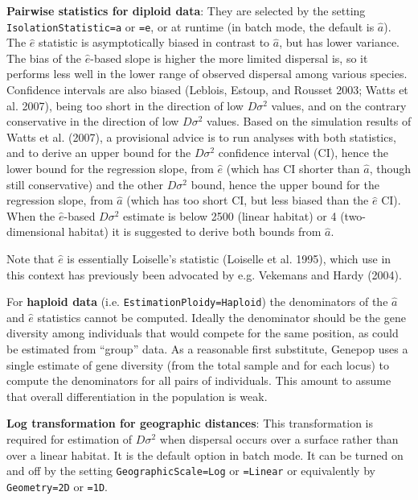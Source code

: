 \documentclass[12pt,]{book}
\theoremstyle{definition}
\theoremstyle{definition}
\theoremstyle{definition}
\theoremstyle{remark}
\begin{document}
\textbf{Pairwise statistics for diploid data}: They are selected by the
setting
\texttt{IsolationStatistic=a} or \texttt{=e}, or at runtime (in
batch mode, the default is \(\hat{a}\)). The \(\hat{e}\) statistic is
asymptotically biased in contrast to \(\hat{a}\), but has lower
variance. The bias of the \(\hat{e}\)-based slope is higher the more
limited dispersal is, so it performs less well in the lower range of
observed dispersal among various species. Confidence intervals are also
biased (Leblois, Estoup, and Rousset 2003; Watts et al. 2007), being too
short in the direction of low \(D\sigma^2\) values, and on the contrary
conservative in the direction of low \(D\sigma^2\) values. Based on the
simulation results of Watts et al. (2007), a provisional advice is to
run analyses with both statistics, and to derive an upper bound for the
\(D\sigma^2\) confidence interval (CI), hence the lower bound for the
regression slope, from \(\hat{e}\) (which has CI shorter than
\(\hat{a}\), though still conservative) and the other \(D\sigma^2\)
bound, hence the upper bound for the regression slope, from \(\hat{a}\)
(which has too short CI, but less biased than the \(\hat{e}\) CI). When
the \(\hat{e}\)-based \(D\sigma^2\) estimate is below 2500 (linear
habitat) or 4 (two-dimensional habitat) it is suggested to derive both
bounds from \(\hat{a}\).

Note that \(\hat{e}\) is essentially Loiselle's
statistic
(Loiselle et al. 1995), which use in this context has previously been
advocated by e.g. Vekemans and Hardy (2004).

For \textbf{haploid data} (i.e. \texttt{EstimationPloidy=Haploid}) the
denominators of the \(\hat{a}\) and \(\hat{e}\) statistics cannot be
computed. Ideally the denominator should be the gene diversity among
individuals that would compete for the same position, as could be
estimated from ``group'' data. As a reasonable first substitute, Genepop
uses a single estimate of gene diversity (from the total sample and for
each locus) to compute the denominators for all pairs of individuals.
This amount to assume that overall differentiation in the population is
weak.

\textbf{Log transformation for geographic distances}: This
transformation is required for estimation of \(D\sigma^2\) when
dispersal occurs over a surface rather than over a linear habitat. It is
the default option in batch mode. It can be turned on and off by the
setting \texttt{GeographicScale=Log} or
\texttt{=Linear} or equivalently by \texttt{Geometry=2D} or
\texttt{=1D}.
\end{document}
